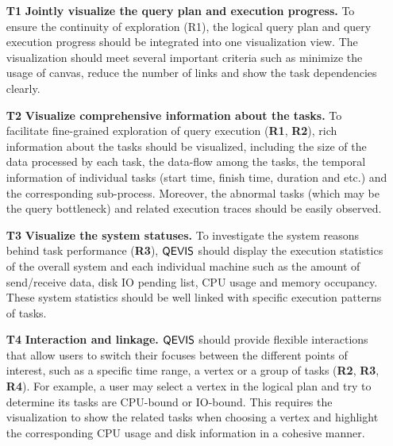 \begin{itemize}
	\item[\textbf{T1}]\textbf{Jointly visualize the query plan and execution progress.} To ensure the continuity of exploration (R1), the logical query plan and query execution progress should be integrated into one visualization view. The visualization should meet several important criteria such as minimize the usage of canvas, reduce the number of links and show the task dependencies clearly.
	
	\item[\textbf{T2}]\textbf{Visualize comprehensive information about the tasks.} To facilitate fine-grained exploration of query execution (\textbf{R1}, \textbf{R2}), rich information about the tasks should be visualized, including the size of the data processed by each task, the data-flow among the tasks, the temporal information of individual tasks (start time, finish time, duration and etc.) and the corresponding sub-process. Moreover, the abnormal tasks (which may be the query bottleneck) and related execution traces should be easily observed.
	
	\item[\textbf{T3}]\textbf{Visualize the system statuses.} To investigate the system reasons behind task performance (\textbf{R3}), $\mathsf{QEVIS}$ should display the execution statistics of the overall system and each individual machine such as the amount of send/receive data, disk IO pending list, CPU usage and memory occupancy. These system statistics should be well linked with specific execution patterns of tasks. 
	
	\item[\textbf{T4}]\textbf{Interaction and linkage.} $\mathsf{QEVIS}$ should provide flexible interactions that allow users to switch their focuses between the different points of interest, such as a specific time range, a vertex or a group of tasks (\textbf{R2}, \textbf{R3}, \textbf{R4}). For example, a user may select a vertex in the logical plan and try to determine its tasks are CPU-bound or IO-bound. This requires the visualization to show the related tasks when choosing a vertex and highlight the corresponding CPU usage and disk information in a cohesive manner.
\end{itemize}


